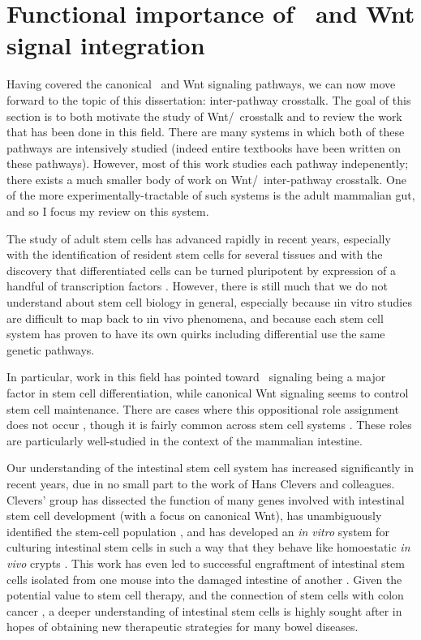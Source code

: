 \section{Functional importance of \tgfbsf\ and Wnt signal integration}
\label{pathways:wntTgfb:function}


Having covered the canonical \tgfbsf\ and Wnt signaling pathways, we
can now move forward to the topic of this dissertation: inter-pathway crosstalk.
The goal of this section is to both motivate the study of Wnt/\tgfbsf\
crosstalk and to review the work that has been done in this field.
There are many systems in which both of these pathways are intensively
studied (indeed entire
textbooks have been written on these pathways). However, most of this work
studies each pathway indepenently; there exists a much
smaller body of work on Wnt/\tgfbsf\ inter-pathway
crosstalk. One of the more experimentally-tractable of such systems is the
adult mammalian gut, and so I focus my review on this system.


The study of adult stem cells has advanced rapidly in recent years,
especially with the identification of resident stem cells for several
tissues \cite{Barker2010} and with the discovery that differentiated
cells can be turned pluripotent by expression of a handful of
transcription factors \cite{Takahashi2006}.
However, there is still much that we do not understand about stem
cell biology in general, especially because \i{in vitro} studies
are difficult to map back to \i{in vivo} phenomena,
and because each stem cell system has proven to have its own quirks including
differential use the same genetic pathways.


In particular, work in this field has
pointed toward \tgfbsf\ signaling being a major factor in stem cell
differentiation, while canonical Wnt signaling seems to control stem cell
maintenance. There are cases where this oppositional role assignment does not occur
\cite{VonBubnoff2001,Fischer2002,Nakashima2005,Itasaki2010a,
Feigenson2011,Lander2012,Malhotra2009,Davidson2012}, though
it is fairly common across stem cell systems
\cite{Verheyen2010,Libusova2010,Gregorieff2005,VandeWetering2002,
Schepers2012,Teo2006}. These roles are
particularly well-studied in the context of the mammalian intestine.


Our understanding
of the intestinal stem cell system has increased significantly in recent years,
due in no small part to the work of Hans Clevers and colleagues.
Clevers' group has dissected the function of many genes involved with
intestinal stem cell development (with a focus on canonical Wnt), has
unambiguously identified the stem-cell population \cite{Barker2007a},
and has developed an \textit{in vitro} system for culturing intestinal
stem cells in such a way that they behave like homoestatic \textit{in vivo} crypts
\cite{Sato2011a,Sato2011b}. This work has even led to successful engraftment
of intestinal stem cells isolated from one mouse into the damaged
intestine of another \cite{Yui2012}. Given the potential value to stem
cell therapy, and the connection of stem cells with colon cancer
\cite{Zeki2007,Barker2009a}, a deeper understanding of intestinal stem
cells is highly sought after in hopes of obtaining new therapeutic strategies
for many bowel diseases.


